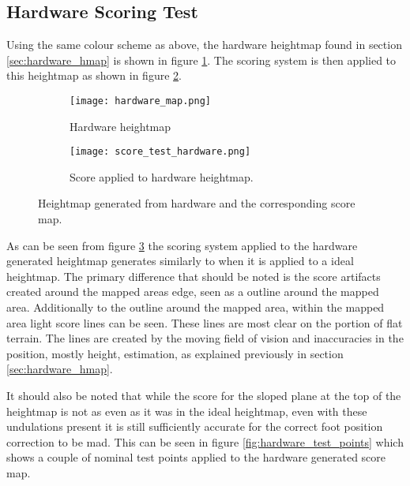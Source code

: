     \subsection{Hardware Scoring Test}
        Using the same colour scheme as above, the hardware heightmap found in section \ref{sec:hardware_hmap} is shown in figure \ref{fig:harware_hmap}. The scoring system is then
        applied to this heightmap as shown in figure \ref{fig:hardware_score_map}.
        \begin{figure}[h]
            \centering
            \begin{subfigure}{.45\textwidth}
                \texttt{[image: hardware\_map.png]}
                \caption{Hardware heightmap}
                \label{fig:harware_hmap}
            \end{subfigure}%
            \begin{subfigure}{.45\textwidth}
                \texttt{[image: score\_test\_hardware.png]}
                \caption{Score applied to hardware heightmap.}
                \label{fig:hardware_score_map}
            \end{subfigure}
            \caption{Heightmap generated from hardware and the corresponding score map.}
            \label{fig:hardware_hmap_scoremap}
        \end{figure}

        \noindent
        As can be seen from figure \ref{fig:hardware_hmap_scoremap} the scoring system applied to the hardware generated heightmap generates
        similarly to when it is applied to a ideal heightmap. The primary difference that should be noted is the score artifacts created around
        the mapped areas edge, seen as a outline around the mapped area. Additionally to the outline around the mapped area, within the mapped area
        light score lines can be seen. These lines are most clear on the portion of flat terrain. The lines are created by the moving field of vision
        and inaccuracies in the position, mostly height, estimation, as explained previously in section \ref{sec:hardware_hmap}.

        It should also be noted that while the score for the sloped plane at the top of the heightmap is not as even as it was in the ideal heightmap,
        even with these undulations present it is still sufficiently accurate for the correct foot position correction to be mad.
        This can be seen in figure \ref{fig:hardware_test_points} which shows a couple of nominal test points applied to the hardware generated score map.

